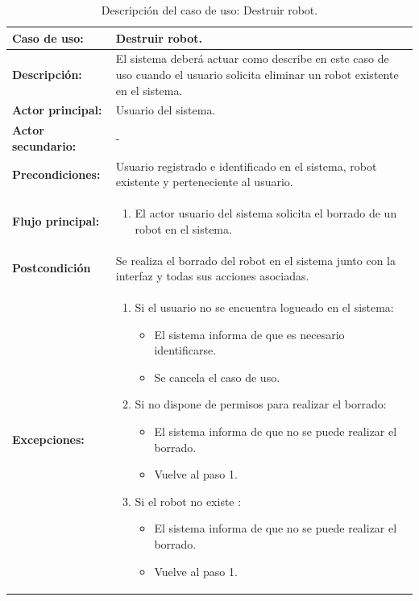 \begin{table}[H]
  \begin{center}
    \begin{tabular}{|p{3.5cm}|p{10cm}|}
      \hline
      {\textbf{Caso de uso:}} & { Destruir robot.} \\
      \hline
      {\textbf{Descripción:}} & { El sistema deberá actuar como describe en este caso de uso cuando el usuario solicita eliminar un robot existente en el sistema.} \\
     \hline
      {\textbf{Actor principal:}} & { Usuario del sistema.} \\
      \hline
      {\textbf{Actor secundario:}} & { - } \\
      \hline
      {\textbf{Precondiciones:}} & { Usuario registrado e identificado en el sistema, robot existente y perteneciente al usuario. } \\
     \hline   
    {\textbf{Flujo principal:}} & { 
      \begin{enumerate}
	\item El actor usuario del sistema solicita el borrado de un robot en el sistema.
      \end{enumerate}
      } \\
     \hline
     {\textbf{Postcondición}} & {Se realiza el borrado del robot en el sistema junto con la interfaz y todas sus acciones asociadas.}\\
     \hline
         {\textbf{Excepciones:}} & {
         \begin{enumerate}
         
          \item Si el usuario no se encuentra logueado en el sistema:
	  \begin{itemize}
	    \item El sistema informa de que es necesario identificarse.
	    \item Se cancela el caso de uso.
	  \end{itemize}
         
          \item Si no dispone de permisos para realizar el borrado:
          \begin{itemize}
           \item El sistema informa de que no se puede realizar el borrado.
           \item Vuelve al paso 1.
          \end{itemize}
	  \item Si el robot no existe :
	    \begin{itemize}
	      \item El sistema informa de que no se puede realizar el borrado.
	      \item Vuelve al paso 1.
	   \end{itemize}	   
         \end{enumerate}
         }\\
     \hline
    \end{tabular}
  \end{center}
\caption{Descripción del caso de uso: Destruir robot.}
\end{table}



